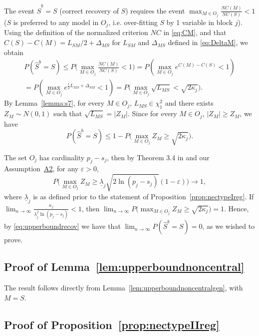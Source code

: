 \documentclass[bj,authoryear]{imsart}
\theoremstyle{plain}
\newcommand{\M}{\mathcal{M}}
\begin{document}
The event $\hat{S}^b=S$ (correct recovery of $S$) requires the event 
$\max_{M\in O_j}\frac{NC(M)}{NC(S)}<1$ ($S$ is preferred to any model in $O_j$, i.e. over-fitting $S$ by 1 variable in block $j$). %
Using the definition of the normalized criterion $NC$ in \eqref{eq:CM}, and that $C(S)-C(M)=L_{SM}/2 + \Delta_{MS}$ for $L_{SM}$ and $\Delta_{MS}$ defined in \eqref{eq:DeltaM}, we obtain
\begin{align}
P(\hat{S}^b=S) 
\leq P\Big(\max_{M\in O_j}\frac{NC(M)}{NC(S)}<1\Big)
= P \left( \max_{M\in O_j} e^{C(M)-C(S)} <1 \right)
\nonumber \\
= P \left( \max_{M\in O_j} e^{\frac{1}{2} L_{MS} + \Delta_{SM}} < 1 \right)
=
P\big(\max_{M\in O_j}\sqrt{L_{MS}}<\sqrt{2\kappa_j}\Big).
\nonumber
\end{align}
By Lemma~\ref{lemma:s7}, for every $M\in O_j$, $L_{MS}\in \chi^2_1$ and there exists $Z_M\sim N(0,1)$ such that $\sqrt{L_{MS}}=|Z_M|$. Since for every $M\in O_j$, $|Z_M|\geq Z_M$, we have
\begin{equation}\label{eq:upperboundrecov}
    P(\hat{S}^b=S) \leq  1-P\big(\max_{M\in O_j}Z_M\geq\sqrt{2\kappa_j}\Big).
\end{equation}

The set $O_j$ has cardinality $p_j-s_j$, then by Theorem 3.4 in \cite{hartigan} and our Assumption~\hyperlink{lab:A2}{A2}, for any $\varepsilon>0$,
$$P\big(\max_{M\in O_j}Z_M \geq \underline{\lambda}_j \sqrt{2 \ln(p_j-s_j)}(1-\varepsilon)\big) \to 1,$$
where $\underline{\lambda}_j$ is as defined prior to the statement of Proposition~\ref{prop:nectypeIreg}.
If $\lim_{n\to\infty}\frac{\kappa_j}{\underline{\lambda}_j^2\ln(p_j-s_j)} <1$, then $\lim_{n \to \infty} P\big(\max_{M\in O_j}Z_M\geq\sqrt{2\kappa_j}\big) = 1$. Hence, by \eqref{eq:upperboundrecov} we have that $\lim_{n \to \infty} P(\hat{S}^b=S) = 0$, as we wished to prove.

\subsection{Proof of Lemma~\ref{lem:upperboundnoncentral}}
The result follows directly from Lemma~\ref{lem:upperboundnoncentralgen}, with $M=S$. 


\subsection{Proof of Proposition~\ref{prop:nectypeIIreg}}
\end{document}
